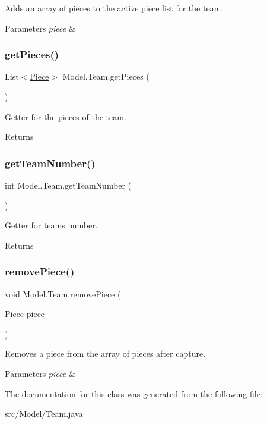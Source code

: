 Adds an array of pieces to the active piece list for the team. 
\begin{DoxyParams}{Parameters}
{\em piece} & \\
\hline
\end{DoxyParams}
\hypertarget{class_model_1_1_team_a3abaa196ae93d5a51e3beca8c94bec76}{}\label{class_model_1_1_team_a3abaa196ae93d5a51e3beca8c94bec76} 
\subsubsection{\texorpdfstring{get\+Pieces()}{getPieces()}}
{\footnotesize\ttfamily List$<$\hyperlink{class_model_1_1_pieces_1_1_piece}{Piece}$>$ Model.\+Team.\+get\+Pieces (\begin{DoxyParamCaption}{ }\end{DoxyParamCaption})}

Getter for the pieces of the team. \begin{DoxyReturn}{Returns}

\end{DoxyReturn}
\hypertarget{class_model_1_1_team_a2e60ec224f46ae7d0b682bdba79a1d85}{}\label{class_model_1_1_team_a2e60ec224f46ae7d0b682bdba79a1d85} 
\subsubsection{\texorpdfstring{get\+Team\+Number()}{getTeamNumber()}}
{\footnotesize\ttfamily int Model.\+Team.\+get\+Team\+Number (\begin{DoxyParamCaption}{ }\end{DoxyParamCaption})}

Getter for team\textquotesingle{}s number. \begin{DoxyReturn}{Returns}

\end{DoxyReturn}
\hypertarget{class_model_1_1_team_ad0e67548dd19712a5be9672c7d9b6d0e}{}\label{class_model_1_1_team_ad0e67548dd19712a5be9672c7d9b6d0e} 
\subsubsection{\texorpdfstring{remove\+Piece()}{removePiece()}}
{\footnotesize\ttfamily void Model.\+Team.\+remove\+Piece (\begin{DoxyParamCaption}\item[{\hyperlink{class_model_1_1_pieces_1_1_piece}{Piece}}]{piece }\end{DoxyParamCaption})}

Removes a piece from the array of pieces after capture. 
\begin{DoxyParams}{Parameters}
{\em piece} & \\
\hline
\end{DoxyParams}


The documentation for this class was generated from the following file\+:\begin{DoxyCompactItemize}
\item 
src/\+Model/Team.\+java\end{DoxyCompactItemize}
